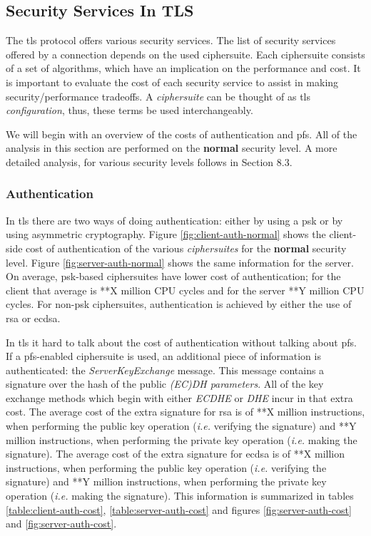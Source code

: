 \documentclass{llncs}
\begin{document}
\subsection{Security Services In TLS}

The \gls{tls} protocol offers various security services. The list of security services offered by a connection
depends on the used ciphersuite. Each ciphersuite consists of a set of algorithms, which have an implication 
on the performance and cost. It is important to evaluate the cost of each security service to assist in making
security/performance tradeoffs. A \textit{ciphersuite} can be thought of as \gls{tls} \textit{configuration},
thus, these terms be used interchangeably.

We will begin with an overview of the costs of authentication and \gls{pfs}. All of the analysis in this section
are performed on the \textbf{normal} security level. A more detailed analysis, for various security levels
follows in Section 8.3.

\subsubsection{Authentication}

In \gls{tls} there are two ways of doing authentication: either by using a \gls{psk} or by using asymmetric cryptography.
Figure \ref{fig:client-auth-normal} shows the client-side cost of authentication of the various \textit{ciphersuites} for 
the \textbf{normal} security level. Figure \ref{fig:server-auth-normal} shows the same information for the server.
On average, \gls{psk}-based ciphersuites have lower cost of authentication; for the client that average is
**X million CPU cycles and for the server **Y million CPU cycles. For non-\gls{psk} ciphersuites, authentication
is achieved by either the use of \gls{rsa} or \gls{ecdsa}.

In \gls{tls} it hard to talk about the cost of authentication without talking about \gls{pfs}. If a \gls{pfs}-enabled
ciphersuite is used, an additional piece of information is authenticated: the \textit{ServerKeyExchange} message.
This message contains a signature over the hash of the public \textit{(EC)DH parameters}. All of the key exchange methods
which begin with either \textit{ECDHE} or \textit{DHE} incur in that extra cost. The average cost of the extra signature 
for \gls{rsa} is of **X million instructions, when performing the public key operation (\textit{i.e.} verifying 
the signature) and **Y million instructions, when performing the private key operation (\textit{i.e.} making the 
signature). The average cost of the extra signature for \gls{ecdsa} is of **X million instructions, 
when performing the public key operation  (\textit{i.e.} verifying the signature) and **Y million instructions, 
when performing the private key operation (\textit{i.e.} making the signature). This information is summarized 
in tables \ref{table:client-auth-cost}, \ref{table:server-auth-cost} and figures \ref{fig:server-auth-cost} and
\ref{fig:server-auth-cost}.
\end{document}
